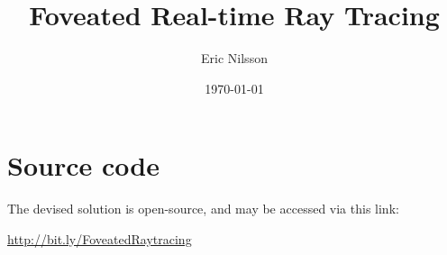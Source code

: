 \documentclass[12pt,twocolumn]{article}
\begin{document}
\title{Foveated Real-time Ray Tracing}
\author{Eric Nilsson}
\date{\today}

\maketitle







\section*{Source code}
The devised solution is open-source, and may be accessed via this link:

\url{http://bit.ly/FoveatedRaytracing}

{}

\end{document}
